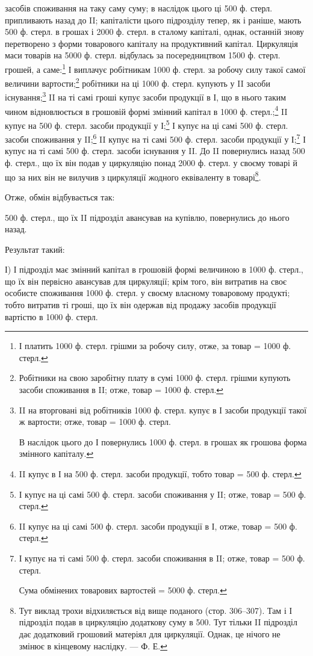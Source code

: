 \parcont{}  %
засобів споживання на таку саму суму; в наслідок цього ці 500 ф. стерл.
припливають назад до II; капіталісти цього підрозділу тепер, як і раніше,
мають 500 ф. стерл. в грошах і 2000 ф. стерл. в сталому капіталі,
однак, останній знову перетворено з форми товарового капіталу на продуктивний
капітал. Циркуляція маси товарів на 5000 ф. стерл. відбулась
за посередництвом 1500 ф. стерл. грошей, а саме:\footnote{
І платить 1000 ф. стерл. грішми за робочу силу, отже, за товар
= 1000 ф. стерл.
} І виплачує робітникам
1000 ф. стерл. за робочу силу такої самої величини вартости;\footnote{
Робітники на свою заробітну плату в сумі 1000 ф. стерл. грішми
купують засоби споживання в II; отже, товар = 1000 ф. стерл.
} робітники на ці 1000 ф. стерл. купують у II засоби існування;\footnote{
II на вторговані від робітників 1000 ф. стерл. купує в І засоби
продукції такої ж вартости; отже, товар = 1000 ф. стерл.

В наслідок цього до І повернулись 1000 ф. стерл. в грошах як грошова
форма змінного капіталу.
} II на ті самі гроші купує засоби продукції в І, що в нього таким
чином відновлюється в грошовій формі змінний капітал в 1000 ф. стерл.;\footnote{
II купує в І на 500 ф. стерл. засоби продукції, тобто товар =
500 ф. стерл.
} II купує на 500 ф. стерл. засоби продукції у І;\footnote{
І купує на ці самі 500 ф. стерл. засоби споживання у II; отже,
товар = 500 ф. стерл.
} І купує на ці
самі 500 ф. стерл. засоби споживання у II;\footnote{
II купує на ці самі 500 ф. стерл. засоби продукції в І, отже,
товар = 500 ф. стерл.
} II купує на ті самі 500 ф.
стерл. засоби продукції у І;\footnote{
І купує на ті самі 500 ф. стерл. засоби споживання в II; отже,
товар = 500 ф. стерл.

Сума обмінених товарових вартостей = 5000 ф. стерл.
} І купує на ті самі 500 ф. стерл. засоби
існування у II. До II повернулись назад 500 ф. стерл., що їх він подав у
циркуляцію понад 2000 ф. стерл. у своєму товарі й що за них він не
вилучив з циркуляції жодного еквіваленту в товарі\footnote{
Тут виклад трохи відхиляється від вище поданого (стор. 306--307). Там і
І підрозділ подав в циркуляцію додаткову суму в 500. Тут тільки II підрозділ дає
додатковий грошовий матеріял для циркуляції. Однак, це нічого не змінює в
кінцевому наслідку. — Ф. Е.
}.

Отже, обмін відбувається так:

500 ф. стерл., що їх II підрозділ авансував на купівлю, повернулись
до нього назад.

Результат такий:

І) І підрозділ має змінний капітал в грошовій формі величиною в 1000 ф.
стерл., що їх він первісно авансував для циркуляції; крім того, він витратив
на своє особисте споживання 1000 ф. стерл. у своєму власному
товаровому продукті; тобто витратив ті гроші, що їх він одержав від продажу
засобів продукції вартістю в 1000 ф. стерл.
